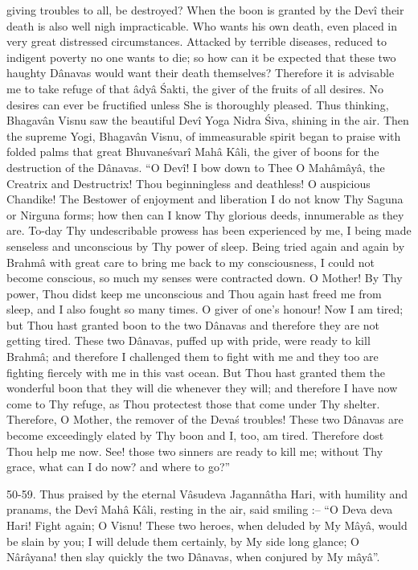 giving troubles to all, be destroyed? When the boon is granted by the Dev\^i their death is also well nigh impracticable. Who wants his own death, even placed in very great distressed circumstances. Attacked by terrible diseases, reduced to indigent poverty no one wants to die; so how can it be expected that these two haughty D\^anavas would want their death themselves? Therefore it is advisable me to take refuge of that \^ady\^a \'Sakti, the giver of the fruits of all desires. No desires can ever be fructified unless She is thoroughly pleased. Thus thinking, Bhagav\^an Visnu saw the beautiful Dev\^i Yoga Nidra \'Siva, shining in the air. Then the supreme Yogi, Bhagav\^an Visnu, of immeasurable spirit began to praise with folded palms that great Bhuvane\'svar\^i Mah\^a K\^ali, the giver of boons for the destruction of the D\^anavas. ``O Dev\^i! I bow down to Thee O Mah\^am\^ay\^a, the Creatrix and Destructrix! Thou beginningless and deathless! O auspicious Chandike! The Bestower of enjoyment and liberation I do not know Thy Saguna or Nirguna forms; how then can I know Thy glorious deeds, innumerable as they are. To-day Thy undescribable prowess has been experienced by me, I being made senseless and unconscious by Thy power of sleep. Being tried again and again by Brahm\^a with great care to bring me back to my consciousness, I could not become conscious, so much my senses were contracted down. O Mother! By Thy power, Thou didst keep me unconscious and Thou again hast freed me from sleep, and I also fought so many times. O giver of one's honour! Now I am tired; but Thou hast granted boon to the two D\^anavas and therefore they are not getting tired. These two D\^anavas, puffed up with pride, were ready to kill Brahm\^a; and therefore I challenged them to fight with me and they too are fighting fiercely with me in this vast ocean. But Thou hast granted them the wonderful boon that they will die whenever they will; and therefore I have now come to Thy refuge, as Thou protectest those that come under Thy shelter. Therefore, O Mother, the remover of the Deva\'s troubles! These two D\^anavas are become exceedingly elated by Thy boon and I, too, am tired. Therefore dost Thou help me now. See! those two sinners are ready to kill me; without Thy grace, what can I do now? and where to go?''

50-59. Thus praised by the eternal V\^asudeva Jagann\^atha Hari, with humility and pranams, the Dev\^i Mah\^a K\^ali, resting in the air, said smiling :-- ``O Deva deva Hari! Fight again; O Visnu! These two heroes, when deluded by My M\^ay\^a, would be slain by you; I will delude them certainly, by My side long glance; O N\^ar\^ayana! then slay quickly the two D\^anavas, when conjured by My m\^ay\^a''.

